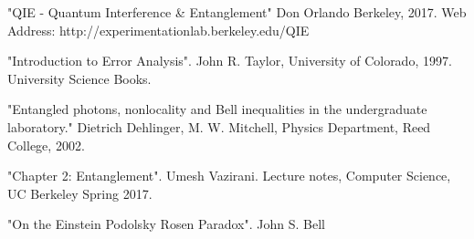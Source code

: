 \documentclass{article}
\begin{document}
\begin{thebibliography}{1} %

   "QIE - Quantum Interference \& Entanglement" Don Orlando Berkeley, 2017. Web Address: http://experimentationlab.berkeley.edu/QIE 

    "Introduction to Error Analysis". John R. Taylor, University of Colorado, 1997. University Science Books.

   "Entangled photons, nonlocality and Bell inequalities in the undergraduate laboratory." Dietrich Dehlinger, M. W. Mitchell, Physics Department, Reed College, 2002.
  
   "Chapter 2: Entanglement". Umesh Vazirani. Lecture notes, Computer Science, UC Berkeley Spring 2017.
  
   "On the Einstein Podolsky Rosen Paradox". John S. Bell

  \end{thebibliography}
\end{document}
